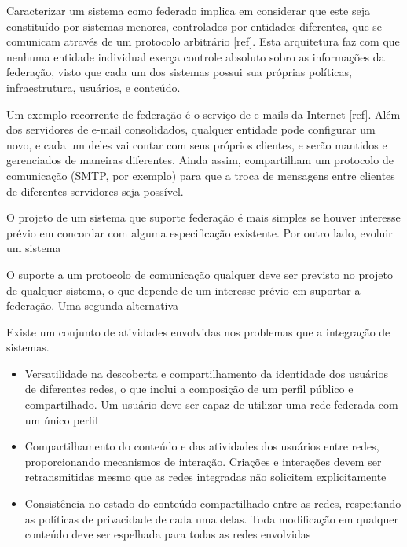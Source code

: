 
Caracterizar um sistema como federado implica em considerar que este seja
constituído por sistemas menores, controlados por entidades diferentes, que se
comunicam através de um protocolo arbitrário [ref]. Esta arquitetura faz com que 
nenhuma entidade individual exerça controle absoluto sobro as informações da 
federação, visto que cada um dos sistemas possui sua próprias políticas, 
infraestrutura, usuários, e conteúdo.


Um exemplo recorrente de federação é o serviço de e-mails da Internet [ref]. Além
dos servidores de e-mail consolidados, qualquer entidade pode configurar um novo, e 
cada um deles vai contar com seus próprios clientes, e serão mantidos e gerenciados
de maneiras diferentes. Ainda assim, compartilham um protocolo de comunicação (SMTP,
por exemplo) para que a troca de mensagens entre clientes de diferentes servidores
seja possível.

O projeto de um sistema que suporte federação é mais simples se houver interesse
prévio em concordar com alguma especificação existente. Por outro lado, evoluir um
sistema 


O suporte a um protocolo de comunicação qualquer deve ser previsto no projeto de
qualquer sistema, o que depende de um interesse prévio em suportar a federação. Uma
segunda alternativa 



Existe um conjunto de atividades envolvidas nos problemas que  a integração
de sistemas.

\begin{itemize}
  \item{Versatilidade na descoberta e compartilhamento da identidade dos usuários
        de diferentes redes, o que inclui a composição de um perfil público e
        compartilhado. Um usuário deve ser capaz de utilizar uma rede federada com
        um único perfil}
  \item{Compartilhamento do conteúdo e das atividades dos usuários entre redes,
        proporcionando mecanismos de interação. Criações e interações devem ser
        retransmitidas mesmo que as redes integradas não solicitem explicitamente}
  \item{Consistência no estado do conteúdo compartilhado entre as redes, respeitando
        as políticas de privacidade de cada uma delas. Toda modificação em qualquer
        conteúdo deve ser espelhada para todas as redes envolvidas}
\end{itemize}

